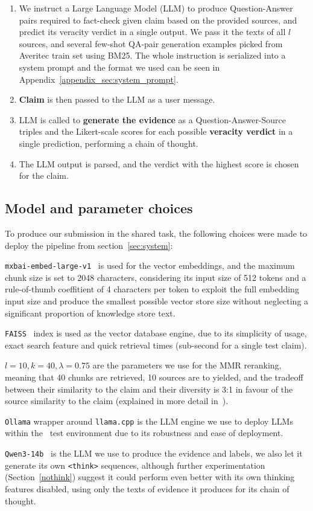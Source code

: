 \begin{enumerate}[label=\roman*.]
\begin{enumerate}[label=\arabic*.]
    \item We instruct a Large Language Model (LLM) to produce Question-Answer pairs required to fact-check given claim based on the provided sources, and predict its veracity verdict in a single output. We pass it the texts of all $l$ sources, and several few-shot QA-pair generation examples picked from Averitec train set using BM25. The whole instruction is serialized into a system prompt and the format we used can be seen in Appendix~\ref{appendix_sec:system_prompt}.
    \item \textbf{Claim} is then passed to the LLM as a user message.
    \item LLM is called to \textbf{generate the evidence} as a Question-Answer-Source triples and the Likert-scale scores for each possible \textbf{veracity verdict} in a single prediction, performing a chain of thought. 
    \item The LLM output is parsed, and the verdict with the highest score is chosen for the claim.
\end{enumerate}
\end{enumerate}


\subsection{Model and parameter choices}
\label{sec:choices}
To produce our submission in the \averitec{} shared task, the following choices were made to deploy the pipeline from section~\ref{sec:system}:

\texttt{mxbai-embed-large-v1}~\cite{li-li-2024-aoe,emb2024mxbai} is used for the vector embeddings, and the maximum chunk size is set to 2048 characters, considering its input size of 512 tokens and a rule-of-thumb coeffitient of 4 characters per token to exploit the full embedding input size and produce the smallest possible vector store size without neglecting a significant proportion of knowledge store text.

\texttt{FAISS}~\cite{douze2024faiss,johnson2019billion} index is used as the vector database engine, due to its simplicity of usage, exact search feature and quick retrieval times (sub-second for a single \averitec{} test claim).

$l=10, k=40, \lambda=0.75$ are the parameters we use for the MMR reranking, meaning that 40 chunks are retrieved, 10 sources are to yielded, and the tradeoff between their similarity to the claim and their diversity is 3:1 in favour of the source similarity to the claim (explained in more detail in~\citealt{ullrich-etal-2024-aic}). 

\texttt{Ollama} wrapper around \texttt{llama.cpp} is the LLM engine we use to deploy LLMs within the \averitec~test environment due to its robustness and ease of deployment.

\texttt{Qwen3-14b}~\cite{yang2025qwen3technicalreport} is the LLM we use to produce the evidence and labels, we also let it generate its own \texttt{<think>} sequences, although further experimentation (Section~\ref{nothink}) suggest it could perform even better with its own thinking features disabled, using only the texts of evidence it produces for its chain of thought.